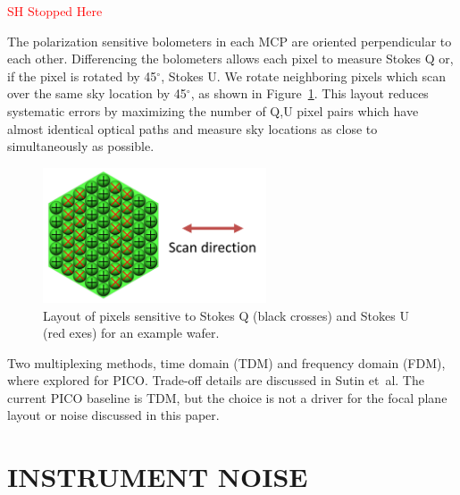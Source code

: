 \documentclass[]{spie}  %
\newcommand{\comr}[1]{\textcolor{red}{#1}}
\newcommand{\dgr}{$^\circ$}
\begin{document}
\comr{SH Stopped Here}

The polarization sensitive bolometers in each MCP are oriented perpendicular to each other. 
Differencing the bolometers allows each pixel to measure Stokes Q or, if the 
pixel is rotated by 45\dgr, Stokes U. We rotate neighboring pixels which scan over the same sky location by 45\dgr, as shown in Figure~\ref{fig:QU}.
This layout reduces systematic errors by maximizing the number of Q,U pixel pairs which have almost identical optical paths and measure sky locations 
as close to simultaneously as possible.  

\begin{figure} [ht]
\begin{center}
\includegraphics[height=4cm]{QU_wafer.png}
\end{center}
\caption { \label{fig:QU} 
Layout of pixels sensitive to Stokes Q (black crosses) and Stokes U (red exes) for an example wafer.}
\end{figure}

Two multiplexing methods, time domain (TDM) and frequency domain (FDM), where explored 
for PICO. Trade-off details are discussed in Sutin et~al.\cite{brian_spie}
The current PICO baseline is TDM, but the choice is not a driver for the focal plane layout or noise discussed in this paper.



\section{INSTRUMENT NOISE}
\label{sec:noise}
\end{document}
